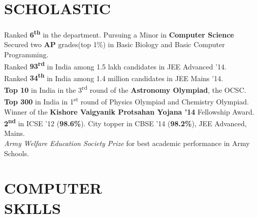 \documentclass[margin, 10pt]{res} %
\begin{document}



\begin{resume}
\vspace*{17mm}
 
\section{SCHOLASTIC}  

Ranked \textbf{6\textsuperscript{th}} in the department. Pursuing a Minor in \textbf{Computer Science}\\
Secured two \textbf{AP} grades(top 1\%) in Basic Biology and Basic Computer Programming.\\
Ranked \textbf{93\textsuperscript{rd}} in India among 1.5 lakh candidates in JEE Advanced '14.\\
Ranked \textbf{34\textsuperscript{th}} in India among 1.4 million candidates in JEE Mains '14.\\
\textbf{Top 10} in India in the 3\textsuperscript{rd} round of the \textbf{Astronomy Olympiad}, the OCSC.\\
\textbf{Top 300} in India in 1\textsuperscript{st} round of Physics Olympiad and Chemistry Olympiad.\\
Winner of the \textbf{Kishore Vaigyanik Protsahan Yojana '14} Fellowship Award.\\
\textbf{2\textsuperscript{nd}} in ICSE '12 (\textbf{98.6\%}). City topper in  CBSE '14 (\textbf{98.2\%}), JEE Advanced, Mains.\\
\textit{Army Welfare Education Society Prize} for best academic performance in Army Schools.

 

\section{COMPUTER \\ SKILLS} 


\end{resume}
\end{document}
